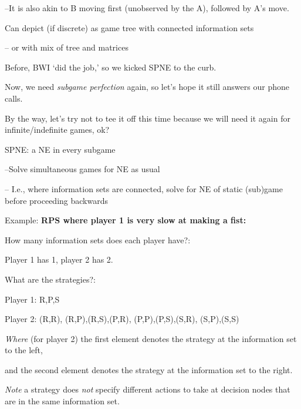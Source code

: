 --It is also akin to B moving first (unobserved by the A), followed by A's
move.

Can depict (if discrete) as game tree with connected information sets

-- or with mix of tree and matrices



Before, BWI `did the job,' so we kicked SPNE to the curb.

Now, we need \textit{subgame perfection }again, so let's hope it still
answers our phone calls.

By the way, let's try not to tee it off this time because we will need it
again for infinite/indefinite games, ok?





SPNE: a NE in every subgame

--Solve simultaneous games for NE as usual

-- I.e., where information sets are connected, solve for NE of static
(sub)game before proceeding backwards



Example: \textbf{RPS where player 1 is very slow at making a fist:}


How many information sets does each player have?:

\bigskip

Player 1 has 1, player 2 has 2.\bigskip

What are the strategies?:

\bigskip

Player 1: R,P,S

Player 2: (R,R), (R,P),(R,S),(P,R), (P,P),(P,S),(S,R), (S,P),(S,S)

\textit{Where }(for player 2) the first element denotes the strategy at the
information set to the left,

and the second element denotes the strategy at the information set to the
right.

\textit{Note} a strategy does \textit{not} specify different actions to take
at decision nodes that are in the same information set. \




